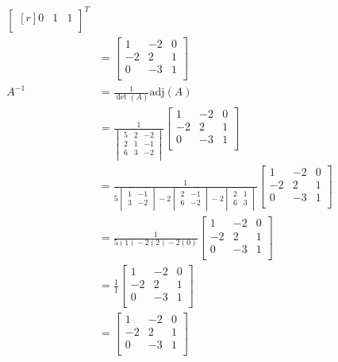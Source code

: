 \documentclass{article}
\begin{document}
\begin{align*}
\begin{bmatrix}[r]
     0&1  &1   \\
  \end{bmatrix}^T\\
  &=\begin{bmatrix}
    1 &-2  &0   \\
     -2&2  &1   \\
     0&-3  &1   \\
  \end{bmatrix}\\
  A^{-1} &=\frac{1}{\det (A)}\text{adj}(A)\\
  &=\frac{1}{\begin{vmatrix}
    5 &2  &-2   \\
     2&1  &-1   \\
     6&3  &-2   \\
  \end{vmatrix}}\begin{bmatrix}
    1 &-2  &0   \\
     -2&2  &1   \\
     0&-3  &1   \\
  \end{bmatrix}\\
  &=\frac{1}{5\begin{vmatrix}
    1 &-1   \\
     3&-2   \\
  \end{vmatrix}-2\begin{vmatrix}
    2 &-1   \\
     6&-2   \\
  \end{vmatrix}-2\begin{vmatrix}
    2 &1   \\
     6&3   \\
  \end{vmatrix}}\begin{bmatrix}
    1 &-2  &0   \\
     -2&2  &1   \\
     0&-3  &1   \\
  \end{bmatrix}\\
  &=\frac{1}{5(1)-2(2)-2(0)}\begin{bmatrix}
    1 &-2  &0   \\
     -2&2  &1   \\
     0&-3  &1   \\
  \end{bmatrix}\\
  &=\frac{1}{1}\begin{bmatrix}
    1 &-2  &0   \\
     -2&2  &1   \\
     0&-3  &1   \\
  \end{bmatrix}\\
  &=\begin{bmatrix}
    1 &-2  &0   \\
     -2&2  &1   \\
     0&-3  &1   \\
  \end{bmatrix}
\end{align*}
\end{document}

